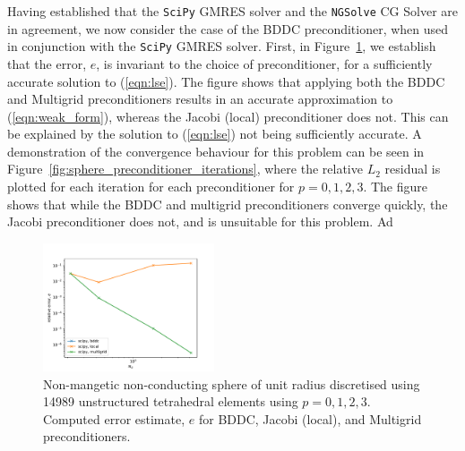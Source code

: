 \documentclass[a4paper,12]{elsarticle}
\theoremstyle{definition}
\begin{document}
Having established that the \texttt{SciPy} GMRES solver and the \texttt{NGSolve} CG Solver are in agreement, we now consider the case of the BDDC preconditioner, when used in conjunction with the \texttt{SciPy} GMRES solver. First, in Figure~\ref{fig:sphere_preconditioner_comparison}, we establish that the error, $e$, is invariant to the choice of preconditioner, for a sufficiently accurate solution to (\ref{eqn:lse}). The figure shows that applying both the BDDC and Multigrid preconditioners results in an accurate approximation to (\ref{eqn:weak_form}), whereas the Jacobi (local) preconditioner does not. This can be explained by the solution to (\ref{eqn:lse}) not being sufficiently accurate. A demonstration of the convergence behaviour for this problem can be seen in Figure~\ref{fig:sphere_preconditioner_iterations}, where the relative $L_2$ residual is plotted for each iteration for each preconditioner for $p=0,1,2,3$. The figure shows that while the BDDC and multigrid preconditioners converge quickly, the Jacobi preconditioner does not, and is unsuitable for this problem. Ad    

\begin{figure}
\centering
\includegraphics[width=0.45\textwidth]{Sphere_p_ref_preconditioner_comparison}
\caption{Non-mangetic non-conducting sphere of unit radius discretised using 14989 unstructured tetrahedral elements using $p=0,1,2,3$. Computed error estimate, $e$ for BDDC, Jacobi (local), and Multigrid preconditioners.}
\label{fig:sphere_preconditioner_comparison}
\end{figure}
\end{document}
